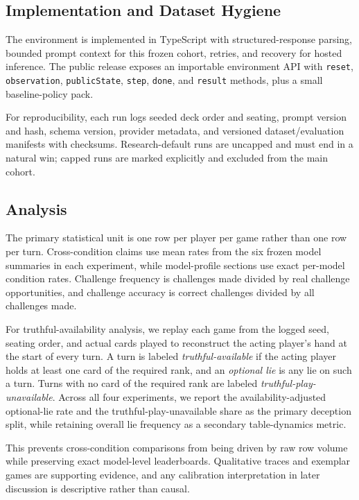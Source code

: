 \subsection{Implementation and Dataset Hygiene}

The environment is implemented in TypeScript with structured-response parsing, bounded prompt context for this frozen cohort, retries, and recovery for hosted inference. The public release exposes an importable environment API with \texttt{reset}, \texttt{observation}, \texttt{publicState}, \texttt{step}, \texttt{done}, and \texttt{result} methods, plus a small baseline-policy pack.

For reproducibility, each run logs seeded deck order and seating, prompt version and hash, schema version, provider metadata, and versioned dataset/evaluation manifests with checksums. Research-default runs are uncapped and must end in a natural win; capped runs are marked explicitly and excluded from the main cohort.

\subsection{Analysis}

The primary statistical unit is one row per player per game rather than one row per turn. Cross-condition claims use mean rates from the six frozen model summaries in each experiment, while model-profile sections use exact per-model condition rates. Challenge frequency is challenges made divided by real challenge opportunities, and challenge accuracy is correct challenges divided by all challenges made.

For truthful-availability analysis, we replay each game from the logged seed, seating order, and actual cards played to reconstruct the acting player's hand at the start of every turn. A turn is labeled \emph{truthful-available} if the acting player holds at least one card of the required rank, and an \emph{optional lie} is any lie on such a turn. Turns with no card of the required rank are labeled \emph{truthful-play-unavailable}. Across all four experiments, we report the availability-adjusted optional-lie rate and the truthful-play-unavailable share as the primary deception split, while retaining overall lie frequency as a secondary table-dynamics metric.

This prevents cross-condition comparisons from being driven by raw row volume while preserving exact model-level leaderboards. Qualitative traces and exemplar games are supporting evidence, and any calibration interpretation in later discussion is descriptive rather than causal.
